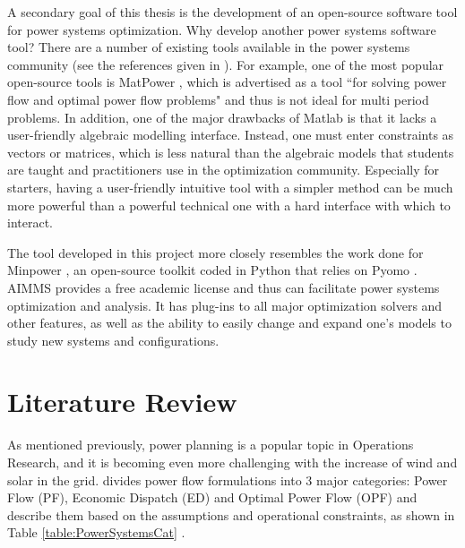 \documentclass[12pt,LUDisStyle,twosided]{book}
\begin{document}
A secondary goal of this thesis is the development of an open-source software tool for power systems optimization. Why develop another power systems software tool? There are a number of existing tools available in the power systems community (see the references given in \cite{greenhall:2012}). For example, one of the most popular open-source tools is MatPower \cite{zimmerman}, which is advertised as a tool ``for solving power flow and optimal power flow problems" and thus is not ideal for multi period problems. In addition, one of the major drawbacks of Matlab is that it lacks a user-friendly algebraic modelling interface.  Instead, one must enter constraints as vectors or matrices, which is less natural than the algebraic models that students are taught and practitioners use in the optimization community. Especially for starters, having a user-friendly intuitive tool with a simpler method can be much more powerful than a powerful technical one with a hard interface with which to interact.

The tool developed in this project more closely resembles the work done for Minpower \cite{greenhall:2012},
an open-source toolkit coded in Python that relies on Pyomo \cite{pyomo:2012}. AIMMS provides a free academic license and thus can facilitate power systems optimization and analysis.
It has plug-ins to all major optimization solvers and other features, as well as the ability to easily change and expand one's models to study new systems and configurations.

\chapter{Literature Review}

As mentioned previously, power planning is a popular topic in Operations Research, and it is becoming even more challenging with the increase of wind and solar in the grid. \citeauthor{cain} \cite{cain} divides power flow formulations into 3 major categories: Power Flow (PF), Economic Dispatch (ED) and Optimal Power Flow (OPF) and describe them based on the assumptions and operational constraints, as shown in Table \ref{table:PowerSystemsCat} .
\end{document}
